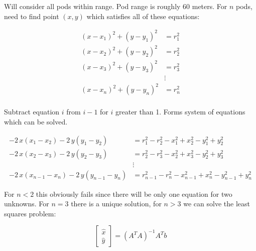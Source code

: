 \documentclass[10pt,letterpaper]{article}
\begin{document}
Will consider all pods within range. Pod range is roughly 60 meters. For $n$ pods, need to find point $(x, y)$ which satisfies all of these equations:

\begin{align*}
    (x - x_1) ^ 2 + (y - y_1) ^ 2 &= r_1^2 \\
    (x - x_2) ^ 2 + (y - y_2) ^ 2 &= r_2^2 \\
    (x - x_3) ^ 2 + (y - y_3) ^ 2 &= r_3^2 \\ 
     & \vdots \\
    (x - x_n) ^ 2 + (y - y_n) ^ 2 &= r_n^2 \\
\end{align*}

Subtract equation $i$ from $i-1$ for $i$ greater than 1. Forms system of equations which can be solved. 

\begin{align*}
    -2 \, x {\left(x_{1} - x_{2}\right)} - 2 \, y {\left(y_{1} - y_{2}\right)} &= r_{1}^{2} - r_{2}^{2} - x_{1}^{2} + x_{2}^{2} - y_{1}^{2} + y_{2}^{2} \\
    -2 \, x {\left(x_{2} - x_{3}\right)} - 2 \, y {\left(y_{2} - y_{3}\right)} &= r_{2}^{2} - r_{3}^{2} - x_{2}^{2} + x_{3}^{2} - y_{2}^{2} + y_{3}^{2} \\
    & \vdots \\
    -2 \, x {\left(x_{n-1} - x_{n}\right)} - 2 \, y {\left(y_{n-1} - y_{n}\right)} &= r_{n-1}^{2} - r_{n}^{2} - x_{n-1}^{2} + x_{n}^{2} - y_{n-1}^{2} + y_{n}^{2}
\end{align*}


For $n < 2$ this obviously fails since there will be only one equation for two unknowns. For $n = 3$ there is a unique solution, for $n > 3$ we can solve the least squares problem:

\begin{equation*}
    \begin{bmatrix}
        \hat{x}\\
        \hat{y}
    \end{bmatrix} = (A^T A)^{-1} A^T b 
\end{equation*}
\end{document}

